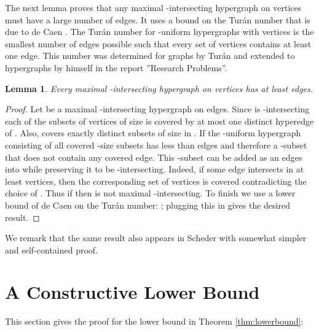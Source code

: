 \documentclass[11pt,letterpaper]{article}
\newtheorem{theorem}{Theorem}
\newtheorem{lemma}[theorem]{Lemma}
\begin{document}
\medskip

The next lemma proves that any maximal -intersecting hypergraph on  vertices must have a large number of edges. It uses a bound on the Tur{\'a}n number that is due to de Caen \cite{de1983extension}. The Tur{\'a}n number  for -uniform hypergraphs with  vertices is the smallest number of edges possible such that every set of  vertices contains at least one edge. This number was determined for graphs by Tur{\'a}n \cite{turan1941extremal} and extended to hypergraphs by himself in the report ''Research Problems''\cite{turan1961research}.\\

\begin{lemma}\label{lem:maximal-hypergraphs}
Every maximal -intersecting hypergraph  on  vertices has at least  edges. 
\end{lemma}
\begin{proof}
Let  be a maximal -intersecting hypergraph on  edges. Since  is -intersecting each of the  subsets of vertices of size  is covered by at most one distinct hyperedge of . Also,  covers exactly  distinct subsets of size  in . If  the -uniform hypergraph consisting of all covered -size subsets has less than  edges and therefore  a -subset  that does not contain any covered edge. This -subset can be added as an edges into  while preserving it to be -intersecting. Indeed, if some edge  intersects  in at least  vertices, then the corresponding set of vertices is covered contradicting the choice of . Thus if  then  is not maximal -intersecting. To finish we use a lower bound of de Caen \cite{de1983extension} on the Tur{\'a}n number: ; plugging this in gives the desired result.
\end{proof}

We remark that the same result also appears in Scheder 
\cite{scheder08almostdisjoint} with somewhat simpler and
self-contained proof.


\section{A Constructive Lower Bound}

This section gives the proof for the lower bound in Theorem \ref{thm:lowerbound}:\\
\iffalse
\begin{theorem}\label{thm:lowerbound}
Every -intersecting -CNF with less than 
 clause intersections or
 variables or 
 clauses is satisfiable and a satisfying assignment can be found efficiently.
\end{theorem}
\fi
\end{document}
